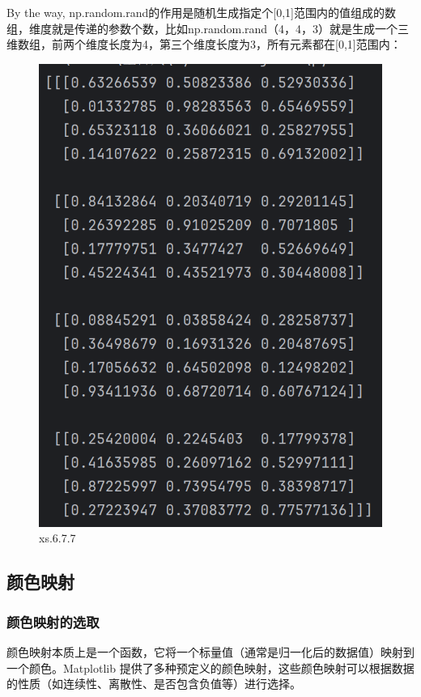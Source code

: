 \documentclass[12pt]{article}
\begin{document}
By the way, np.random.rand的作用是随机生成指定个[0,1]范围内的值组成的数组，维度就是传递的参数个数，比如np.random.rand（4，4，3）就是生成一个三维数组，前两个维度长度为4，第三个维度长度为3，所有元素都在[0,1]范围内：
\begin{figure}[H]
    \centering
    \includegraphics[width=0.4\linewidth]{np.rand数组 outcome1.png}
    \caption{xs.6.7.7}
    \label{fig:enter-label}
\end{figure}
\newpage




\subsection{颜色映射}\label{颜色映射}
\subsubsection{颜色映射的选取}
颜色映射本质上是一个函数，它将一个标量值（通常是归一化后的数据值）映射到一个颜色。Matplotlib 提供了多种预定义的颜色映射，这些颜色映射可以根据数据的性质（如连续性、离散性、是否包含负值等）进行选择。
\end{document}
